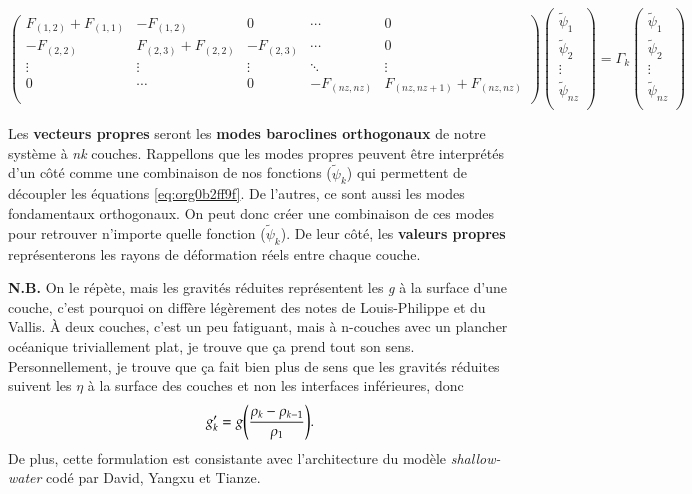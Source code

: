 \documentclass{article}
\numberwithin{equation}{section}
\newcommand{\tpsi}{\tilde{\psi}}
\begin{document}
\[
\begin{pmatrix}
 F_{(1,2)} + F_{(1,1)} & -F_{(1,2)} & 0 & \cdots & 0 \\[0pt]
 -F_{(2,2)} & F_{(2,3)} + F_{(2,2)} & -F_{(2,3)} & \cdots & 0 \\[0pt]
 \vdots & \vdots & \vdots & \ddots & \vdots \\[0pt]
 0 & \cdots & 0 & -F_{(nz,nz)} & F_{(nz,nz+1)} + F_{(nz,nz)} \\[0pt]
\end{pmatrix}
\begin{pmatrix}
 \tpsi_1 \\[0pt]
 \tpsi_2 \\[0pt]
 \vdots \\[0pt]
 \tpsi_{nz} \\[0pt]
\end{pmatrix}
=\Gamma_k\begin{pmatrix}
 \tpsi_1 \\[0pt]
 \tpsi_2 \\[0pt]
 \vdots \\[0pt]
 \tpsi_{nz} \\[0pt]
\end{pmatrix}
\]

Les \textbf{vecteurs propres} seront les \textbf{modes baroclines orthogonaux} de notre système à \emph{nk} couches.
Rappellons que les modes propres peuvent être interprétés d'un côté comme une combinaison de nos fonctions (\(\tpsi_k\)) qui permettent de découpler les équations \ref{eq:org0b2ff9f}.
De l'autres, ce sont aussi les modes fondamentaux orthogonaux.
On peut donc créer une combinaison de ces modes pour retrouver n'importe quelle fonction (\(\tpsi_k\)).
De leur côté, les \textbf{valeurs propres} représenterons les rayons de déformation réels entre chaque couche.\bigskip



\textbf{N.B.} On le répète, mais les gravités réduites représentent les \emph{g} à la surface d'une couche, c'est pourquoi on diffère légèrement des notes de Louis-Philippe et du Vallis.
À deux couches, c'est un peu fatiguant, mais à n-couches avec un plancher océanique triviallement plat, je trouve que ça prend tout son sens.
Personnellement, je trouve que ça fait bien plus de sens que les gravités réduites suivent les \(\eta\) à la surface des couches et non les interfaces inférieures, donc
\begin{equation}
g_k' = g \qty(\frac{\rho_k - \rho_{k-1}}{\rho_1}).
\end{equation}
De plus, cette formulation est consistante avec l'architecture du modèle \emph{shallow-water} codé par David, Yangxu et Tianze.
\end{document}
